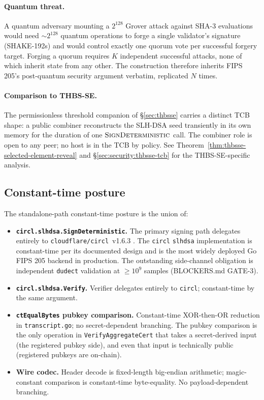 \paragraph{Quantum threat.} A quantum adversary mounting a
$2^{128}$ Grover attack against SHA-3 evaluations would need
$\sim 2^{128}$ quantum operations to forge a single validator's
signature (SHAKE-192s) and would control exactly one quorum vote
per successful forgery target. Forging a quorum requires
$K$ independent successful attacks, none of which inherit
state from any other. The construction therefore inherits FIPS
205's post-quantum security argument verbatim, replicated
$N$ times.

\paragraph{Comparison to THBS-SE.} The permissionless threshold
companion of \S\ref{sec:thbsse} carries a distinct TCB shape: a
public combiner reconstructs the SLH-DSA seed transiently in
its own memory for the duration of one
$\textsc{SignDeterministic}$ call. The combiner role is open to
any peer; no host is in the TCB by policy. See
Theorem~\ref{thm:thbsse-selected-element-reveal} and
\S\ref{sec:security:thbsse-tcb} for the THBS-SE-specific
analysis.

\subsection{Constant-time posture}
\label{sec:security:ct}

The standalone-path constant-time posture is the union of:
\begin{itemize}[leftmargin=2em,nosep]
  \item \textbf{\texttt{circl.slhdsa.SignDeterministic}.} The
        primary signing path delegates entirely to
        \texttt{cloudflare/circl}~v1.6.3 \cite{circl}. The
        \texttt{circl} \texttt{slhdsa} implementation is
        constant-time per its documented design and is the most
        widely deployed Go FIPS 205 backend in production. The
        outstanding side-channel obligation is independent
        \texttt{dudect} \cite{dudect} validation at $\ge 10^9$
        samples (BLOCKERS.md GATE-3).
  \item \textbf{\texttt{circl.slhdsa.Verify}.} Verifier
        delegates entirely to \texttt{circl}; constant-time by
        the same argument.
  \item \textbf{\texttt{ctEqualBytes} pubkey comparison.}
        Constant-time XOR-then-OR reduction in
        \texttt{transcript.go}; no secret-dependent branching.
        The pubkey comparison is the only operation in
        \texttt{VerifyAggregateCert} that takes a secret-derived
        input (the registered pubkey side), and even that input
        is technically public (registered pubkeys are
        on-chain).
  \item \textbf{Wire codec.} Header decode is fixed-length
        big-endian arithmetic; magic-constant comparison is
        constant-time byte-equality. No payload-dependent
        branching.
\end{itemize}

